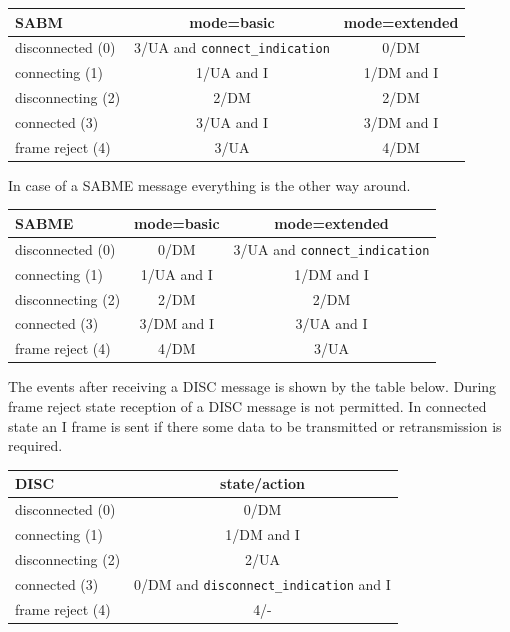 \documentclass[a4paper]{article}
\begin{document}
{\footnotesize
\begin{center}
\begin{tabular}{|l|c|c|}
\hline
 SABM &mode=basic&mode=extended\\
\hline
 disconnected (0)& 3/UA and \verb!connect_indication!& 0/DM\\
\hline
 connecting (1) & 1/UA and I & 1/DM and I \\
\hline
 disconnecting (2) & 2/DM& 2/DM\\
\hline
 connected (3) & 3/UA and I& 3/DM and I\\
\hline
 frame reject (4) & 3/UA & 4/DM\\
\hline
\end{tabular}
\end{center}
}

In case of a SABME message everything is the other way around.

{\footnotesize
\begin{center}
\begin{tabular}{|l|c|c|}
\hline
 SABME &mode=basic&mode=extended\\
\hline
 disconnected (0)& 0/DM & 3/UA and \verb!connect_indication! \\
\hline
 connecting (1) & 1/UA and I & 1/DM and I \\
\hline
 disconnecting (2) & 2/DM& 2/DM\\
\hline
 connected (3) & 3/DM and I& 3/UA and I\\
\hline
 frame reject (4) & 4/DM & 3/UA\\
\hline
\end{tabular}
\end{center}
}


The events after receiving a DISC message is shown by the table below. During frame reject state reception of a DISC message is not permitted. In connected state an I frame is sent if there some data to be transmitted or retransmission is required.

{\footnotesize
\begin{center}
\begin{tabular}{|l|c|}
\hline
 DISC & state/action\\
\hline
 disconnected (0)& 0/DM \\
\hline
 connecting (1) & 1/DM and I \\
\hline
 disconnecting (2) & 2/UA\\
\hline
 connected (3) & 0/DM and \verb!disconnect_indication! and I\\
\hline
 frame reject (4) & 4/- \\
\hline
\end{tabular}
\end{center}
}
\end{document}

